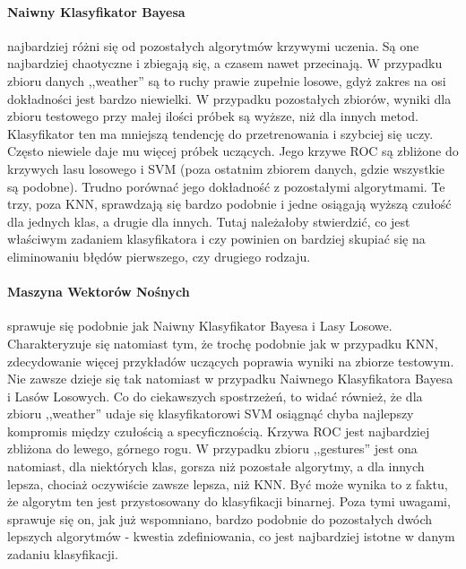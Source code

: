 \documentclass{classrep}
\begin{document}
{{            \paragraph{Naiwny Klasyfikator Bayesa} najbardziej różni się od pozostałych algorytmów krzywymi uczenia. Są one najbardziej chaotyczne i zbiegają się, a czasem nawet przecinają. W przypadku zbioru danych ,,weather'' są to ruchy prawie zupełnie losowe, gdyż zakres na osi dokładności jest bardzo niewielki. W przypadku pozostałych zbiorów, wyniki dla zbioru testowego przy małej ilości próbek są wyższe, niż dla innych metod. Klasyfikator ten ma mniejszą tendencję do przetrenowania i szybciej się uczy. Często niewiele daje mu więcej próbek uczących. Jego krzywe ROC są zbliżone do krzywych lasu losowego i SVM (poza ostatnim zbiorem danych, gdzie wszystkie są podobne). Trudno porównać jego dokładność z pozostałymi algorytmami. Te trzy, poza KNN, sprawdzają się bardzo podobnie i jedne osiągają wyższą czułość dla jednych klas, a drugie dla innych. Tutaj należałoby stwierdzić, co jest właściwym zadaniem klasyfikatora i czy powinien on bardziej skupiać się na eliminowaniu błędów pierwszego, czy drugiego rodzaju.
            
            \paragraph{Maszyna Wektorów Nośnych} sprawuje się podobnie jak Naiwny Klasyfikator Bayesa i Lasy Losowe. Charakteryzuje się natomiast tym, że trochę podobnie jak w przypadku KNN, zdecydowanie więcej przykładów uczących poprawia wyniki na zbiorze testowym. Nie zawsze dzieje się tak natomiast w przypadku Naiwnego Klasyfikatora Bayesa i Lasów Losowych. Co do ciekawszych spostrzeżeń, to widać również, że dla zbioru ,,weather'' udaje się klasyfikatorowi SVM osiągnąć chyba najlepszy kompromis między czułością a specyficznością. Krzywa ROC jest najbardziej zbliżona do lewego, górnego rogu. W przypadku zbioru ,,gestures'' jest ona natomiast, dla niektórych klas, gorsza niż pozostałe algorytmy, a dla innych lepsza, chociaż oczywiście zawsze lepsza, niż KNN. Być może wynika to z faktu, że algorytm ten jest przystosowany do klasyfikacji binarnej. Poza tymi uwagami, sprawuje się on, jak już wspomniano, bardzo podobnie do pozostałych dwóch lepszych algorytmów - kwestia zdefiniowania, co jest najbardziej istotne w danym zadaniu klasyfikacji.
            
}}
\end{document}
